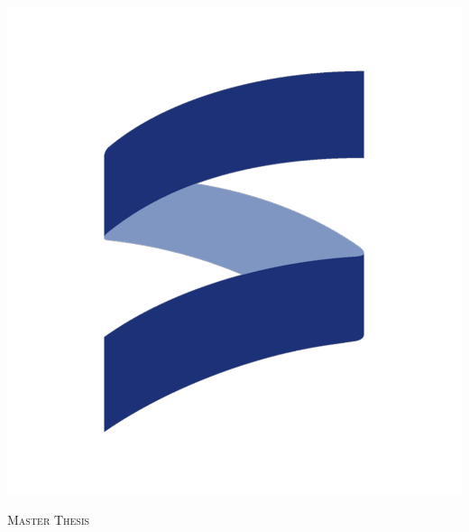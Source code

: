 \documentclass[
11pt, %
english, %
singlespacing, %
headsepline, %
]{MastersDoctoralThesis} %
\author{Jacob \textsc{Lindahl}} %
\begin{document}
\frontmatter %

\pagestyle{plain} %


\begin{titlepage}
\begin{center}
\includegraphics[scale=0.06]{Figures/isct.pdf} \\[0.1cm]
\vspace*{.01\textheight}
{\scshape\LARGE \univname\par}\vspace{1.5cm} %
\textsc{\Large Master Thesis}\\[0.5cm] %

\HRule \\[0.4cm] %
{\huge \bfseries \ttitle\par}\vspace{0.4cm} %
\HRule \\[1.5cm] %


\end{center}
\end{titlepage}
\end{document}
